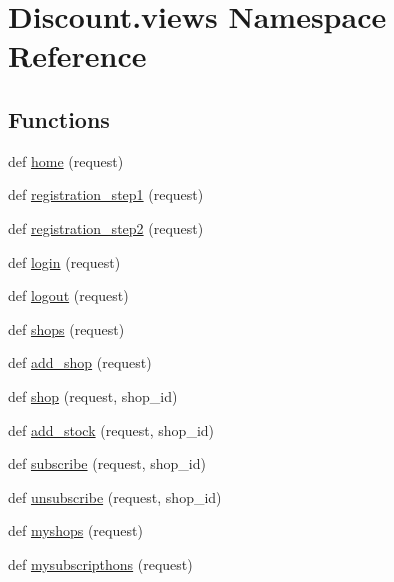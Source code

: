 \hypertarget{namespace_discount_1_1views}{}\section{Discount.\+views Namespace Reference}
\label{namespace_discount_1_1views}
\subsection*{Functions}
\begin{DoxyCompactItemize}
\item 
def \hyperlink{namespace_discount_1_1views_ae8581c9b9d2f9447119a4512c0d6b40f}{home} (request)
\item 
def \hyperlink{namespace_discount_1_1views_a6fe3e41a2a7d661f576ef987dddcb1e4}{registration\+\_\+step1} (request)
\item 
def \hyperlink{namespace_discount_1_1views_aa1fb55cf7351af98f96003a48105e5b3}{registration\+\_\+step2} (request)
\item 
def \hyperlink{namespace_discount_1_1views_a58edd1662d569cc6f8714bf106da6a1e}{login} (request)
\item 
def \hyperlink{namespace_discount_1_1views_a033c4753c804f383c8fefdca2b2e0566}{logout} (request)
\item 
def \hyperlink{namespace_discount_1_1views_aaf1abec1101e66c5e419f25d92712b2d}{shops} (request)
\item 
def \hyperlink{namespace_discount_1_1views_ac9256cde9ae572d015edf90e90f4b00b}{add\+\_\+shop} (request)
\item 
def \hyperlink{namespace_discount_1_1views_a5a3728b3017c05f1c8ccabd832f3fdd5}{shop} (request, shop\+\_\+id)
\item 
def \hyperlink{namespace_discount_1_1views_a96b5b651d32cec9071708084686e3ced}{add\+\_\+stock} (request, shop\+\_\+id)
\item 
def \hyperlink{namespace_discount_1_1views_a0b960c314da8b607db4cff5669781c7d}{subscribe} (request, shop\+\_\+id)
\item 
def \hyperlink{namespace_discount_1_1views_a50ef4ece5895ac221b7a940de2f89ba1}{unsubscribe} (request, shop\+\_\+id)
\item 
def \hyperlink{namespace_discount_1_1views_a8e05c2613033ea5883a63ce9422bb09e}{myshops} (request)
\item 
def \hyperlink{namespace_discount_1_1views_abe8b7cafc25d6f2d730aa68ae948f586}{mysubscripthons} (request)
\item 

\end{DoxyCompactItemize}
